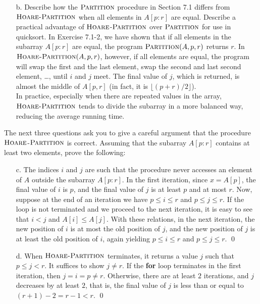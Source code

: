 \documentclass[12pt,reqno]{amsart}
\newif\ifanswer
\begin{document}
\begin{enumerate}[1.]
\begin{enumerate}
    \item[b.] Describe how the $\textsc{Partition}$ procedure in Section 7.1 differs from $\textsc{Hoare-Partition}$ when all elements in $A[p: r]$ are equal. Describe a practical advantage of $\textsc{Hoare}$-$\textsc{Partition}$ over $\textsc{Partition}$ for use in quicksort.
    \ifanswer
    \noindent {\bf \\Solution}
    In Exercise 7.1-2, we have shown that if all elements in the subarray $A[p: r]$ are equal, the program $\textsc{Partition}(A, p, r)$ returns $r$. In $\textsc{Hoare-Partition}(A, p, r)$, however, if all elements are equal, the program will swap the first and the last element, swap the second and last second element, \dots, until $i$ and $j$ meet. The final value of $j$, which is returned, is almost the middle of $A[p, r]$ (in fact, it is $\lfloor (p + r)/2 \rfloor$).\\
    In practice, especially when there are repeated values in the array, $\textsc{Hoare-Partition}$ tends to divide the subarray in a more balanced way, reducing the average running time.
\end{enumerate}
The next three questions ask you to give a careful argument that the procedure $\textsc{Hoare}$-$\textsc{Partition}$ is correct. Assuming that the subarray $A[p: r]$ contains at least two elements, prove the following:

\begin{enumerate}
    \item[c.] The indices $i$ and $j$ are such that the procedure never accesses an element of $A$ outside the subarray $A[p: r]$.
    \ifanswer
    \noindent {\bf \\Solution}
    In the first iteration, since $x = A[p]$, the final value of $i$ is $p$, and the final value of $j$ is at least $p$ and at most $r$. Now, suppose at the end of an iteration we have $p \leq i \leq r$ and $p \leq j \leq r$. If the loop is not terminated and we proceed to the next iteration, it is easy to see that $i < j$ and $A[i] \leq A[j]$. With these relations, in the next iteration, the new position of $i$ is at most the old position of $j$, and the new position of $j$ is at least the old position of $i$, again yielding $p \leq i \leq r$ and $p \leq j \leq r$. \qed
    
    \item[d.] When $\textsc{Hoare-Partition}$ terminates, it returns a value $j$ such that $p \leq j < r$.
    \ifanswer
    \noindent {\bf \\Solution}
    It suffices to show $j \neq r$. If the \textbf{for} loop terminates in the first iteration, then $j = i = p \neq r$. Otherwise, there are at least $2$ iterations, and $j$ decreases by at least $2$, that is, the final value of $j$ is less than or equal to $(r + 1) - 2 = r - 1 < r$. \qed
    

\end{enumerate}
\end{enumerate}
\end{document}
